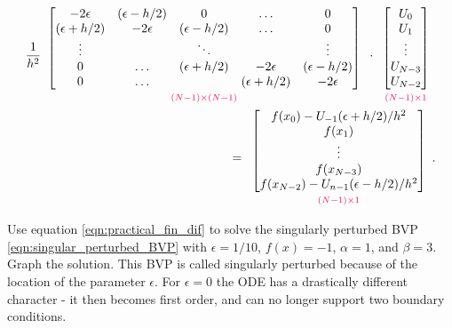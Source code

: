 \begin{align}
    \label{eqn:practical_fin_dif}
    \begin{split}
\frac{1}{h^2}
\begin{array}{c}
\begin{bmatrix}-2\epsilon & (\epsilon - h/2) &0&\hdots &0 \\ (\epsilon + h/2) &-2\epsilon & (\epsilon - h/2) &\hdots &0\\ \vdots &  & \ddots & &\vdots \\
0 & \hdots & (\epsilon + h/2) &-2\epsilon & (\epsilon - h/2) \\ 0 & \hdots & & (\epsilon + h/2) &-2\epsilon
\end{bmatrix}\\
{\scriptstyle\textcolor{red}{(N-1)\times(N-1)}}
\end{array}
\cdot
\begin{array}{c}
\begin{bmatrix}U_{0}\\U_1\\ \vdots \\U_{N-3} \\U_{N-2}\end{bmatrix}\\
{\scriptstyle\textcolor{red}{(N-1)\times1}}
\end{array}\\
 =
 \begin{array}{c}
 \begin{bmatrix}f(x_0) -U_{-1}(\epsilon + h/2)/h^2 \\f(x_1)\\ \vdots \\ f(x_{N-3})\\ f(x_{N-2})-U_{n-1}(\epsilon - h/2)/h^2 \end{bmatrix}\\
 {\scriptstyle\textcolor{red}{(N-1)\times1}}
 \end{array}.
    \end{split}
\end{align}



\begin{problem}
Use equation \eqref{eqn:practical_fin_dif} to solve the singularly perturbed BVP \eqref{eqn:singular_perturbed_BVP} with $\epsilon = 1/10$, $f(x) = -1$, $\alpha=1$, and $\beta=3$. Graph the solution.
This BVP is called singularly perturbed because of the location of the parameter $\epsilon$.
For $\epsilon = 0$ the ODE has a drastically different character - it then becomes first order, and can no longer support two boundary conditions.
    \label{prob:finitedifference2:prob1}
\end{problem}

